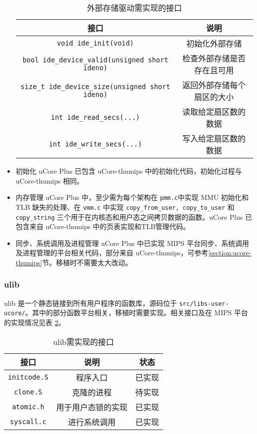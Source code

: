 \begin{itemize}
\begin{table}[!htbp]
\centering
\begin{tabular}{|c|c|}
\hline
\textbf{接口}                                      & \textbf{说明}                      \\ \hline
\texttt{void ide\_init(void)}  & 初始化外部存储                      \\ \hline
\texttt{bool ide\_device\_valid(unsigned short ideno)}   & 检查外部存储是否存在且可用                             \\ \hline
\texttt{size\_t ide\_device\_size(unsigned short ideno)}   & 返回外部存储每个扇区的大小                             \\ \hline
\texttt{int ide\_read\_secs(...)}   & 读取给定扇区数的数据                             \\ \hline
\texttt{int ide\_write\_secs(...)}   & 写入给定扇区数的数据                             \\ \hline
\end{tabular}
    \caption{外部存储驱动需实现的接口}
    \label{table:ide_driver_interface}
\end{table}

\item{初始化}
uCore Plus 已包含 uCore-thumips 中的初始化代码，初始化过程与 uCore-thumips 相同。
\item{内存管理}
uCore Plus 中，至少需为每个架构在 \texttt{pmm.c}中实现 MMU 初始化和 TLB 缺失的处理、在 \texttt{vmm.c} 中实现 \texttt{copy\_from\_user, copy\_to\_user} 和 \texttt{copy\_string} 三个用于在内核态和用户态之间拷贝数据的函数。uCore Plus 已包含来自 uCore-thumips 中的页表实现和TLB管理代码。
\item{同步、系统调用及进程管理} uCore Plus 中已实现 MIPS 平台同步、系统调用及进程管理的平台相关代码，部分来自 uCore-thumips，可参考\ref{section:ucore-thumips}节。移植时不需要太大改动。

\end{itemize}
\subsubsection{ulib}

ulib 是一个静态链接到所有用户程序的函数库，源码位于 \texttt{src/libs-user-ucore/}。其中的部分函数平台相关，移植时需要实现。相关接口及在 MIPS 平台的实现情况见表 \ref{table:ulib_interface}。

\begin{table}[!htbp]
\centering
\begin{tabular}{|c|c|c|}
\hline
\textbf{接口} & \textbf{说明} & \textbf{状态} \\ \hline
\texttt{initcode.S} & 程序入口 & 已实现 \\ \hline
\texttt{clone.S} & 克隆的进程 & 待实现 \\ \hline
\texttt{atomic.h} & 用于用户态锁的实现 & 已实现 \\ \hline
\texttt{syscall.c} & 进行系统调用 & 已实现 \\ \hline
\end{tabular}
    \caption{ulib需实现的接口}
    \label{table:ulib_interface}
\end{table}

